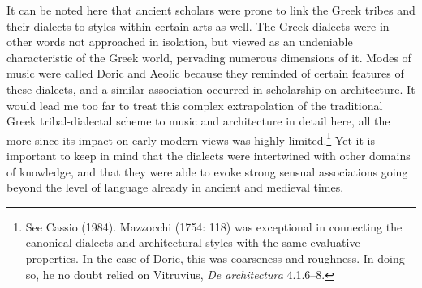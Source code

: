 \documentclass[12pt]{article}
\newenvironment{styleStandard}{\renewcommand\baselinestretch{1.25}\setlength\leftskip{0in}\setlength\rightskip{0in}\setlength\parindent{0.1972in}\setlength\parfillskip{0pt plus 1fil}\setlength\parskip{0in plus 1pt}\writerlistparindent\writerlistleftskip\leavevmode\normalfont\normalsize\writerlistlabel\ignorespaces}{\unskip\vspace{0in plus 1pt}\par}
\newcommand\writerlistleftskip{}
\newcommand\writerlistparindent{}
\newcommand\writerlistlabel{}
\begin{document}
\begin{styleStandard}
It can be noted here that ancient scholars were prone to link the Greek tribes and their dialects to styles within certain arts as well. The Greek dialects were in other words not approached in isolation, but viewed as an undeniable characteristic of the Greek world, pervading numerous dimensions of it. Modes of music were called Doric and Aeolic because they reminded of certain features of these dialects, and a similar association occurred in scholarship on architecture. It would lead me too far to treat this complex extrapolation of the traditional Greek tribal-dialectal scheme to music and architecture in detail here, all the more since its impact on early modern views was highly limited.\footnote{ See Cassio (1984). Mazzocchi (1754: 118) was exceptional in connecting the canonical dialects and architectural styles with the same evaluative properties. In the case of Doric, this was coarseness and roughness. In doing so, he no doubt relied on Vitruvius, \textit{De architectura} 4.1.6–8.} Yet it is important to keep in mind that the dialects were intertwined with other domains of knowledge, and that they were able to evoke strong sensual associations going beyond the level of language already in ancient and medieval times.
\end{styleStandard}
\end{document}
